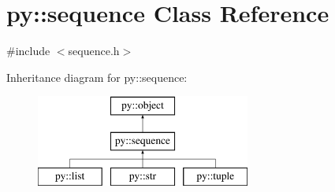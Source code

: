 \hypertarget{classpy_1_1sequence}{}\section{py\+:\+:sequence Class Reference}
\label{classpy_1_1sequence}


{\ttfamily \#include $<$sequence.\+h$>$}

Inheritance diagram for py\+:\+:sequence\+:\begin{figure}[H]
\begin{center}
\leavevmode
\includegraphics[height=3.000000cm]{classpy_1_1sequence}
\end{center}
\end{figure}
